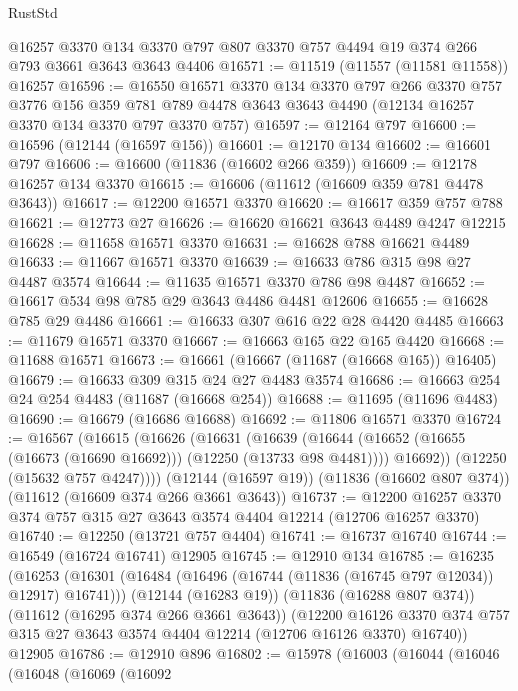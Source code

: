 \begin{lexlean}{RustStd}
\begin{coremodule}
    @16257
    @3370
    @134
    @3370
    @797
    @807
    @3370
    @757
    @4494
    @19
    @374
    @266
    @793
    @3661
    @3643
    @3643
    @4406
@16571 := @11519 (@11557 (@11581 @11558)) @16257
@16596 := @16550
    @16571
    @3370
    @134
    @3370
    @797
    @266
    @3370
    @757
    @3776
    @156
    @359
    @781
    @789
    @4478
    @3643
    @3643
    @4490
    (@12134 @16257 @3370 @134 @3370 @797 @3370 @757)
@16597 := @12164 @797
@16600 := @16596 (@12144 (@16597 @156))
@16601 := @12170 @134
@16602 := @16601 @797
@16606 := @16600 (@11836 (@16602 @266 @359))
@16609 := @12178 @16257 @134 @3370
@16615 := @16606 (@11612 (@16609 @359 @781 @4478 @3643))
@16617 := @12200 @16571 @3370
@16620 := @16617 @359 @757 @788
@16621 := @12773 @27
@16626 := @16620 @16621 @3643 @4489 @4247 @12215
@16628 := @11658 @16571 @3370
@16631 := @16628 @788 @16621 @4489
@16633 := @11667 @16571 @3370
@16639 := @16633 @786 @315 @98 @27 @4487 @3574
@16644 := @11635 @16571 @3370 @786 @98 @4487
@16652 := @16617 @534 @98 @785 @29 @3643 @4486 @4481 @12606
@16655 := @16628 @785 @29 @4486
@16661 := @16633 @307 @616 @22 @28 @4420 @4485
@16663 := @11679 @16571 @3370
@16667 := @16663 @165 @22 @165 @4420
@16668 := @11688 @16571
@16673 := @16661 (@16667 (@11687 (@16668 @165)) @16405)
@16679 := @16633 @309 @315 @24 @27 @4483 @3574
@16686 := @16663 @254 @24 @254 @4483 (@11687 (@16668 @254))
@16688 := @11695 (@11696 @4483)
@16690 := @16679 (@16686 @16688)
@16692 := @11806 @16571 @3370
@16724 := @16567
    (@16615
      (@16626
        (@16631
          (@16639
            (@16644 (@16652 (@16655 (@16673 (@16690 @16692))) (@12250 (@13733 @98 @4481))))
            @16692))
        (@12250 (@15632 @757 @4247))))
    (@12144 (@16597 @19))
    (@11836 (@16602 @807 @374))
    (@11612 (@16609 @374 @266 @3661 @3643))
@16737 := @12200 @16257 @3370 @374 @757 @315 @27 @3643 @3574 @4404 @12214 (@12706 @16257 @3370)
@16740 := @12250 (@13721 @757 @4404)
@16741 := @16737 @16740
@16744 := @16549 (@16724 @16741) @12905
@16745 := @12910 @134
@16785 := @16235
    (@16253
      (@16301 (@16484 (@16496 (@16744 (@11836 (@16745 @797 @12034)) @12917) @16741)))
      (@12144 (@16283 @19))
      (@11836 (@16288 @807 @374))
      (@11612 (@16295 @374 @266 @3661 @3643))
      (@12200
        @16126
        @3370
        @374
        @757
        @315
        @27
        @3643
        @3574
        @4404
        @12214
        (@12706 @16126 @3370)
        @16740))
    @12905
@16786 := @12910 @896
@16802 := @15978
    (@16003
      (@16044
        (@16046
          (@16048
            (@16069
              (@16092

\end{coremodule}
\end{lexlean}
